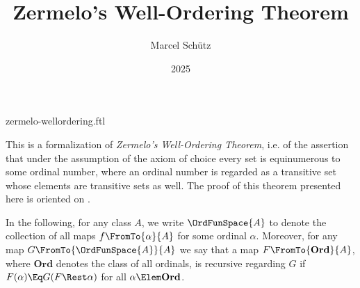 \documentclass{stex}
\title{Zermelo's Well-Ordering Theorem}
\author{Marcel Schütz}
\date{2025}
\newcommand\Ordinals{\textbf{Ord}}
\begin{document}
\begin{smodule}{zermelo-wellordering.ftl}



\maketitle

\noindent This is a formalization of \textit{Zermelo's Well-Ordering Theorem},
i.e. of the assertion that under the assumption of the axiom of choice every
set is equinumerous to some ordinal number, where an ordinal number is
regarded as a transitive set whose elements are transitive sets as well.
The proof of this theorem presented here is oriented on \cite{Koepke2018}.

In the following, for any class $A$, we write $\OrdFunSpace{A}$ to
denote the collection of all maps $f \FromTo{\alpha}{A}$ for some ordinal
$\alpha$.
Moreover, for any map $G \FromTo{\OrdFunSpace{A}}{A}$ we say that a map
$F \FromTo{\Ordinals}{A}$, where $\Ordinals$ denotes the class of all ordinals, is
recursive regarding $G$ if $F(\alpha) \Eq G(F \Rest \alpha)$ for all
$\alpha \Elem \Ordinals$.


\end{smodule}
\end{document}
